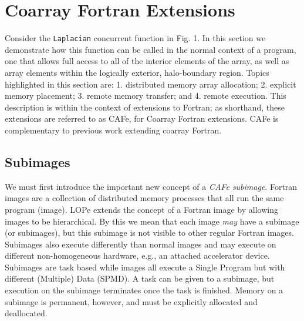 \section{Coarray Fortran Extensions}


Consider the \texttt{Laplacian} concurrent function in Fig. 1.  In this section we demonstrate how
this function can be called in the normal context of a program, one that allows full access to all
of the interior elements of the array, as well as array elements within the logically exterior,
halo-boundary region.  Topics highlighted in this section are: 1. distributed memory array
allocation; 2. explicit memory placement; 3. remote memory transfer; and 4. remote execution.  This
description is within the context of extensions to Fortran; as shorthand, these extensions are
referred to as CAFe, for Coarray Fortran extensions.  CAFe is complementary to previous work
extending coarray Fortran\cite{mellor-crummey:2009:caf2,jin:2011:caf2}.

\subsection{Subimages}

We must first introduce the important new concept of a \emph{CAFe subimage}.  Fortran images are a collection of
distributed memory processes that all run the same program (image).  LOPe extends the concept of a
Fortran image by allowing images to be hierarchical.  By this we mean that each image \emph{may}
have a subimage (or subimages), but this subimage is not visible to other regular Fortran images.
Subimages also execute differently than normal images and may execute on different non-homogeneous
hardware, e.g., an attached accelerator device.  Subimages are task based while images all execute
a Single Program but with different (Multiple) Data (SPMD).  A task can be given to a subimage, but
execution on the subimage terminates once the task is finished.  Memory on a subimage is permanent,
however, and must be explicitly allocated and deallocated.

